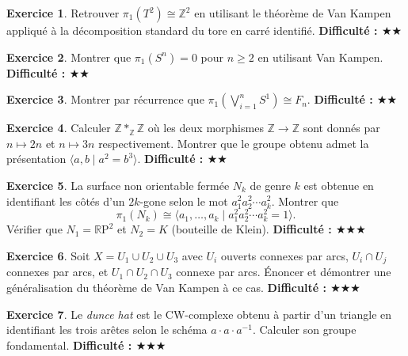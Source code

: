 \documentclass[12pt,a4paper,openany]{book}
\theoremstyle{definition}
\newtheorem{exercice}{Exercice}[chapter]
\theoremstyle{plain}
\theoremstyle{remark}
\newcommand{\Z}{\mathbb{Z}}
\newcommand{\RP}{\mathbb{R}\mathrm{P}}
\begin{document}
\begin{exercice}\label{exo:pi1-tore-vk}
Retrouver $\pi_1(T^2) \cong \Z^2$ en utilisant le théorème de Van Kampen appliqué à la
décomposition standard du tore en carré identifié. \textbf{Difficulté : \(\bigstar\bigstar\)}
\end{exercice}

\begin{exercice}\label{exo:pi1-sphere}
Montrer que $\pi_1(S^n) = 0$ pour $n \geq 2$ en utilisant Van Kampen.
\textbf{Difficulté : \(\bigstar\bigstar\)}
\end{exercice}

\begin{exercice}\label{exo:pi1-bouquet-n}
Montrer par récurrence que $\pi_1\!\left(\bigvee_{i=1}^n S^1\right) \cong F_n$.
\textbf{Difficulté : \(\bigstar\bigstar\)}
\end{exercice}

\begin{exercice}\label{exo:amalgame-calcul}
Calculer $\Z *_\Z \Z$ où les deux morphismes $\Z \to \Z$ sont donnés par
$n \mapsto 2n$ et $n \mapsto 3n$ respectivement. Montrer que le groupe obtenu admet la
présentation $\langle a, b \mid a^2 = b^3 \rangle$.
\textbf{Difficulté : \(\bigstar\bigstar\)}
\end{exercice}

\begin{exercice}\label{exo:pi1-surface-non-orientable}
La surface non orientable fermée $N_k$ de genre $k$ est obtenue en identifiant les côtés d'un
$2k$-gone selon le mot $a_1^2 a_2^2 \cdots a_k^2$. Montrer que
\[
\pi_1(N_k) \cong \langle a_1, \ldots, a_k \mid a_1^2 a_2^2 \cdots a_k^2 = 1 \rangle.
\]
Vérifier que $N_1 = \RP^2$ et $N_2 = K$ (bouteille de Klein).
\textbf{Difficulté : \(\bigstar\bigstar\bigstar\)}
\end{exercice}

\begin{exercice}\label{exo:vk-trois-ouverts}
Soit $X = U_1 \cup U_2 \cup U_3$ avec $U_i$ ouverts connexes par arcs, $U_i \cap U_j$
connexes par arcs, et $U_1 \cap U_2 \cap U_3$ connexe par arcs. Énoncer et démontrer
une généralisation du théorème de Van Kampen à ce cas.
\textbf{Difficulté : \(\bigstar\bigstar\bigstar\)}
\end{exercice}

\begin{exercice}\label{exo:dunce-hat}
Le \emph{dunce hat} est le CW-complexe obtenu à partir d'un triangle en identifiant les
trois arêtes selon le schéma $a \cdot a \cdot a^{-1}$. Calculer son groupe fondamental.
\textbf{Difficulté : \(\bigstar\bigstar\bigstar\)}
\end{exercice}
\end{document}
